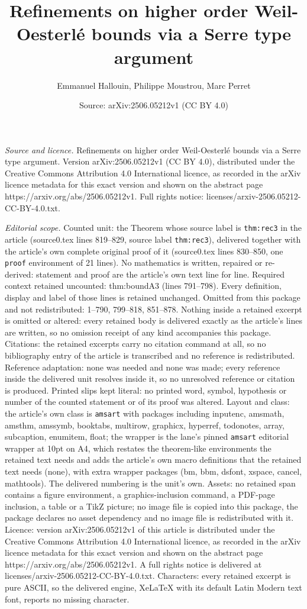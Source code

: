 \documentclass[10pt,a4paper]{amsart}
\title[Refinements on higher order Weil-Oesterl\'e bounds via a Ser]{Refinements on higher order Weil-Oesterl\'e bounds via a Serre type argument}
\author{Emmanuel Hallouin, Philippe Moustrou, Marc Perret}
\date{Source: arXiv:2506.05212v1 (CC BY 4.0)}
\begin{document}
\maketitle

\noindent\emph{Source and licence.} Refinements on higher order Weil-Oesterl\'e bounds via a Serre type argument. Version arXiv:2506.05212v1 (CC BY 4.0), distributed under the Creative Commons Attribution 4.0 International licence, as recorded in the arXiv licence metadata for this exact version and shown on the abstract page https://arxiv.org/abs/2506.05212v1. Full rights notice: licenses/arxiv-2506.05212-CC-BY-4.0.txt.\par\smallskip

\noindent\textit{Editorial scope.} Counted unit: the Theorem whose source label is \texttt{thm:rec3} in the article (source0.tex lines 819--829, source label \texttt{thm:rec3}), delivered together with the article's own complete original proof of it (source0.tex lines 830--850, one \texttt{proof} environment of 21 lines). No mathematics is written, repaired or re-derived: statement and proof are the article's own text line for line. Required context retained uncounted: thm:boundA3 (lines 791--798). Every definition, display and label of those lines is retained unchanged. Omitted from this package and not redistributed: 1--790, 799--818, 851--878. Nothing inside a retained excerpt is omitted or altered: every retained body is delivered exactly as the article's lines are written, so no omission receipt of any kind accompanies this package. Citations: the retained excerpts carry no citation command at all, so no bibliography entry of the article is transcribed and no reference is redistributed. Reference adaptation: none was needed and none was made; every reference inside the delivered unit resolves inside it, so no unresolved reference or citation is produced. Printed slips kept literal: no printed word, symbol, hypothesis or number of the counted statement or of its proof was altered. Layout and class: the article's own class is \texttt{amsart} with packages including inputenc, amsmath, amsthm, amssymb, booktabs, multirow, graphicx, hyperref, todonotes, array, subcaption, enumitem, float; the wrapper is the lane's pinned \texttt{amsart} editorial wrapper at 10pt on A4, which restates the theorem-like environments the retained text needs and adds the article's own macro definitions that the retained text needs (none), with extra wrapper packages (bm, bbm, dsfont, xspace, cancel, mathtools). The delivered numbering is the unit's own. Assets: no retained span contains a figure environment, a graphics-inclusion command, a PDF-page inclusion, a table or a TikZ picture; no image file is copied into this package, the package declares no asset dependency and no image file is redistributed with it. Licence: version arXiv:2506.05212v1 of this article is distributed under the Creative Commons Attribution 4.0 International licence, as recorded in the arXiv licence metadata for this exact version and shown on the abstract page https://arxiv.org/abs/2506.05212v1. A full rights notice is delivered at licenses/arxiv-2506.05212-CC-BY-4.0.txt. Characters: every retained excerpt is pure ASCII, so the delivered engine, XeLaTeX with its default Latin Modern text font, reports no missing character.
\end{document}
